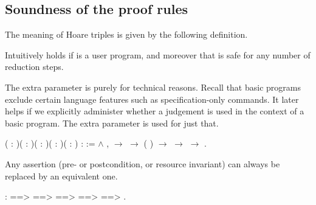 \documentclass[12pt]{report}
\begin{document}
\subsection{Soundness of the proof rules}



 The meaning of Hoare triples is given by 
    the following definition. 

 Intuitively       holds if  is a user program,
    and moreover that  is safe for any number of reduction steps. 

 The extra  parameter is purely for technical reasons.
    Recall that basic programs exclude certain language features
    such as specification-only commands. It later helps if we explicitly
    administer whether a  judgement is used in the context of a
    basic program. The extra  parameter is used for just that. \begin{coqdoccode}
\coqdocemptyline
\coqdocnoindent
{}  ( : )( : )( : )( : )( : ) :  :=\coqdoceol
\coqdocindent{1.00em}
  \ensuremath{\land}\coqdoceol
\coqdocindent{1.00em}
\coqdockw{\ensuremath{\forall}}     ,\coqdoceol
\coqdocindent{2.00em}
  \ensuremath{\rightarrow}\coqdoceol
\coqdocindent{2.00em}
  \ensuremath{\rightarrow}\coqdoceol
\coqdocindent{2.00em}
 ( )  \ensuremath{\rightarrow}\coqdoceol
\coqdocindent{2.00em}
  \ensuremath{\rightarrow}\coqdoceol
\coqdocindent{2.00em}
      \ensuremath{\rightarrow}\coqdoceol
\coqdocindent{2.00em}
         .\coqdoceol
\coqdocemptyline
\end{coqdoccode}
Any assertion (pre- or postcondition, or resource invariant)
    can always be replaced by an equivalent one. \begin{coqdoccode}
\coqdocemptyline
\coqdocnoindent
{}   : \coqdoceol
\coqdocindent{1.00em}
   ==>  ==>  ==>  ==>  ==> \coqdoceol
\coqdocindent{2.00em}
 .\coqdoceol
\coqdocemptyline
\end{coqdoccode}
\end{document}
